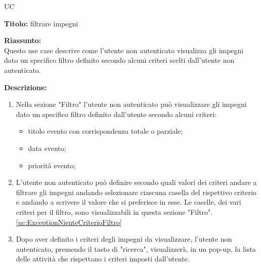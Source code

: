 \begin{listaPersonale}{UC}
    \newpage


    \begin{center}
        
    \end{center}
    \begin{listaPersonale2}[UC] {}
            \textbf{Titolo:} filtrare impegni

            \textbf{Riassunto:} \\
            Questo use case descrive come l'utente non autenticato visualizza gli impegni dato un specifico filtro definito secondo alcuni criteri scelti dall'utente non autenticato.

            \textbf{Descrizione:}
            \begin{enumerate}
                \item Nella sezione "Filtro" l'utente non autenticato può visualizzare gli impegni dato un specifico filtro definito dall'utente secondo alcuni criteri:
                      \begin{itemize}
                          \item titolo evento con corrispondenza totale o parziale;
                          \item data evento;
                          \item priorità evento;
                      \end{itemize}

                \item L'utente non autenticato può definire secondo quali valori dei criteri andare a filtrare gli impegni andando selezionare ciascuna casella del rispettivo criterio e andando a scrivere il valore che si preferisce in esse. Le caselle, dei vari criteri per il filtro, sono visualizzabili in questa sezione "Filtro". \ref{uc:ExceptionNienteCriterioFiltro}
                \item Dopo aver definito i criteri degli impegni da visualizzare, l'utente non autenticato, premendo il tasto di "ricerca", visualizzerà, in un pop-up, la lista delle attività che rispettano i criteri imposti dall'utente.
            \end{enumerate}



\end{listaPersonale2}
\end{listaPersonale}
